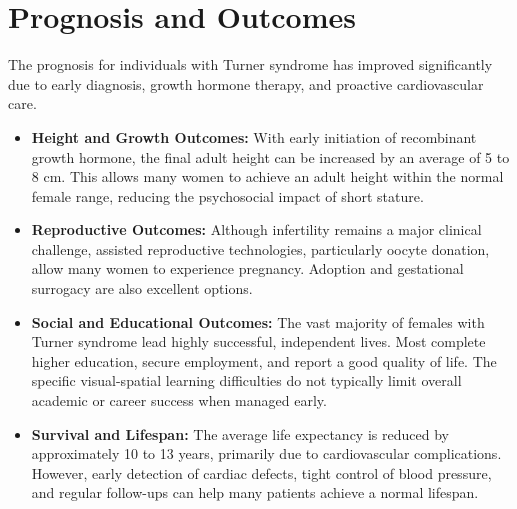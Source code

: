\section*{Prognosis and Outcomes}
The prognosis for individuals with Turner syndrome has improved significantly due to early diagnosis, growth hormone therapy, and proactive cardiovascular care.
\begin{itemize}
    \item \textbf{Height and Growth Outcomes:} With early initiation of recombinant growth hormone, the final adult height can be increased by an average of 5 to 8 cm. This allows many women to achieve an adult height within the normal female range, reducing the psychosocial impact of short stature.
    \item \textbf{Reproductive Outcomes:} Although infertility remains a major clinical challenge, assisted reproductive technologies, particularly oocyte donation, allow many women to experience pregnancy. Adoption and gestational surrogacy are also excellent options.
    \item \textbf{Social and Educational Outcomes:} The vast majority of females with Turner syndrome lead highly successful, independent lives. Most complete higher education, secure employment, and report a good quality of life. The specific visual-spatial learning difficulties do not typically limit overall academic or career success when managed early.
    \item \textbf{Survival and Lifespan:} The average life expectancy is reduced by approximately 10 to 13 years, primarily due to cardiovascular complications. However, early detection of cardiac defects, tight control of blood pressure, and regular follow-ups can help many patients achieve a normal lifespan.
\end{itemize}

